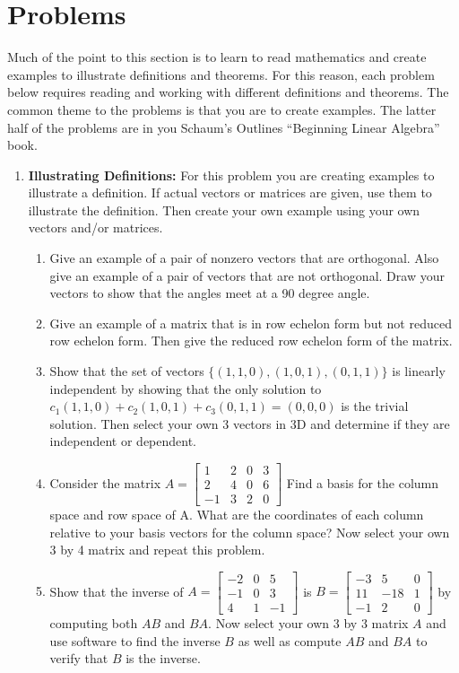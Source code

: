 

\section{Problems}

Much of the point to this section is to learn to read mathematics and create examples to illustrate definitions and theorems.  
For this reason, each problem below requires reading and working with different definitions and theorems. The common theme to the problems is that you are to create examples.  The latter half of the problems are in you Schaum's Outlines  ``Beginning Linear Algebra'' book.


\begin{enumerate}


\item \textbf{Illustrating Definitions:} \label{definition problems}
For this problem you are creating examples to illustrate a definition. If actual vectors or matrices are given, use them to illustrate the definition. Then create your own example using your own vectors and/or matrices.

\begin{enumerate}
	\item Give an example of a pair of nonzero vectors that are orthogonal. Also give an example of a pair of vectors that are not orthogonal. Draw your vectors to show that the angles meet at a 90 degree angle.
	\item Give an example of a matrix that is in row echelon form but not reduced row echelon form. Then give the reduced row echelon form of the matrix. 
	\item Show that the set of vectors $\{(1,1,0),(1,0,1),(0,1,1)\}$ is linearly independent by showing that the only solution to $c_1(1,1,0)+c_2(1,0,1)+c_3(0,1,1)=(0,0,0)$ is the trivial solution. Then select your own 3 vectors in 3D and determine if they are independent or dependent.  
	\item Consider the matrix 
	$A=\begin{bmatrix}
	1 & 2 & 0 & 3 \\
	2 & 4 & 0 & 6 \\
	-1 & 3 & 2 & 0
	\end{bmatrix}$ 
	Find a basis for the column space and row space of A. What are the coordinates of each column relative to your basis vectors for the column space?  Now select your own 3 by 4 matrix and repeat this problem.
	\item Show that the inverse of 
	$A=
\begin{bmatrix}
 -2 & 0 & 5 \\
 -1 & 0 & 3 \\
 4 & 1 & -1
\end{bmatrix}
$
is 
$B=
\begin{bmatrix}
 -3 & 5 & 0 \\
 11 & -18 & 1 \\
 -1 & 2 & 0
\end{bmatrix}
$ by computing both $AB$ and $BA$. Now select your own 3 by 3 matrix $A$ and use software to find the inverse $B$ as well as compute $AB$ and $BA$ to verify that $B$ is the inverse.


\end{enumerate}
\end{enumerate}
